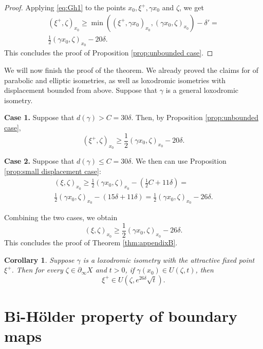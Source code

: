 \documentclass[12pt]{amsbook}%
\newtheorem{cor}[thm]{Corollary}
\theoremstyle{definition}
\theoremstyle{remark}
\numberwithin{section}{chapter}
\numberwithin{subsection}{section}
\numberwithin{figure}{chapter}
\def\half{\frac{1}{2}}
\def\ga{\gamma}
\def\geo{\partial_\infty}
\begin{document}
{{\begin{proof}
Applying \eqref{eq:Gh1} to the points $x_0, \xi^+, \ga x_0$ and $\zeta$, we get 
\begin{align*}
(\xi^+, \zeta)_{x_0} \geqslant \min( (\xi^+, \ga x_0)_{x_0}, (\ga x_0, \zeta)_{x_0}) -\delta'= \\
\half (\ga x_0, \zeta)_{x_0} -20\delta.  
\end{align*}
This concludes the proof of Proposition \ref{prop:unbounded case}.  \end{proof} 

\medskip
We will now finish the proof of the theorem. We already proved the claims for of parabolic and elliptic isometries, as well as loxodromic isometries with 
displacement bounded from above. Suppose that $\ga$ is a general loxodromic isometry. 

\medskip 
{\bf Case 1.} Suppose that $d(\ga)> C=30\delta$. Then, by Proposition \ref{prop:unbounded case}, 
$$
(\xi^+, \zeta)_{x_0} \geqslant \half (\ga x_0, \zeta)_{x_0} -20\delta. 
$$

{\bf Case 2.}  Suppose that $d(\ga)\leqslant C=30\delta$. We then can use Proposition \ref{prop:small displacement case}:
\begin{align*}
(\xi, \zeta)_{x_0} \geqslant   \half (\ga x_0, \zeta)_{x_0} - (\half C + 11\delta)=  \\
  \half (\ga x_0, \zeta)_{x_0} - (15\delta + 11\delta)= 
 \half (\ga x_0, \zeta)_{x_0} - 26\delta. 
\end{align*}


Combining the two cases, we obtain
$$
(\xi, \zeta)_{x_0} \geqslant \half (\ga x_0, \zeta)_{x_0} - 26\delta. 
$$
This concludes the proof of Theorem \ref{thm:appendixB}. 

\begin{cor}
Suppose $\ga$ is a loxodromic isometry with the attractive fixed point $\xi^+$. Then for every $\zeta\in \geo X$ and $t>0$, if $\ga(x_0)\in U(\zeta, t)$, then 
$$
\xi^+\in U(\zeta, e^{26\delta}\sqrt{t}). 
$$  
\end{cor}






\chapter[Appendix C]{%
Bi-H\"older property of boundary maps} 
\label{sec:holder}



}}
\end{document}
